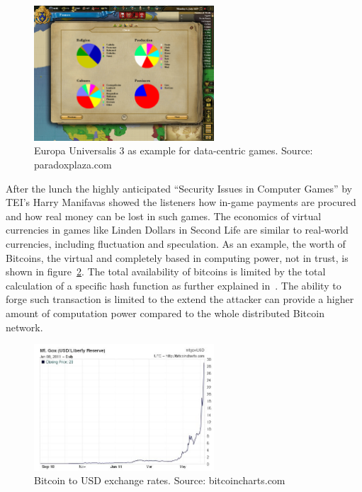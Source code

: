 \documentclass[bibtotocnumbered, headsepline,normalheadings,12pt]{report}
\begin{document}
\begin{figure}[H]
    \centering
    \includegraphics[width=0.6\textwidth]{eu.png}%
    \caption{Europa Universalis 3 as example for data-centric games. Source: paradoxplaza.com}
    \label{fig:eu}%
\end{figure}

After the lunch the highly anticipated ``Security Issues in Computer Games'' by TEI's Harry Manifavas showed the listeners how in-game payments are 
procured and how real money can be lost in such games. The economics of virtual currencies in games like Linden Dollars in Second Life are similar
to real-world currencies, including fluctuation and speculation. As an example, the worth of Bitcoins, the virtual and completely based in computing power,
not in trust, is shown in figure~\ref{fig:bc}. The total availability of bitcoins is limited by the total calculation of a specific hash function as further
explained in~\cite{bitcoin}. The ability to forge such transaction is limited to the extend the attacker can provide a higher amount of computation power 
compared to the whole distributed Bitcoin network.

\begin{figure}[H]
    \centering
    \includegraphics[width=0.6\textwidth]{bc.jpg}%
    \caption{Bitcoin to USD exchange rates. Source: bitcoincharts.com}
    \label{fig:bc}%
\end{figure}
\end{document}
